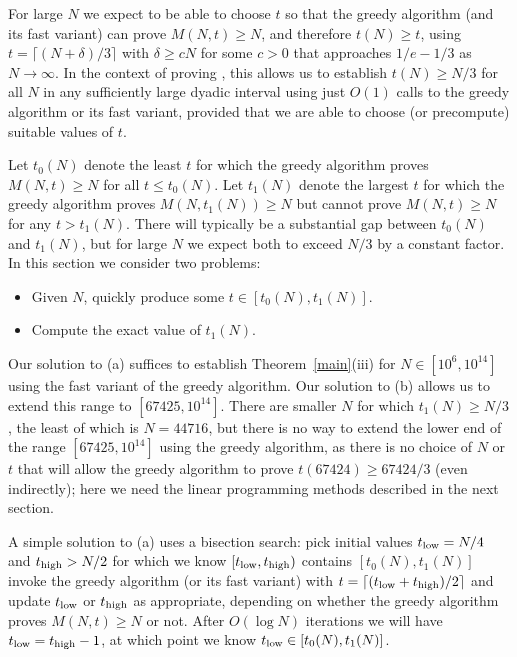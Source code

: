 \documentclass[10pt,a4paper,reqno]{amsart}
\numberwithin{equation}{section}
\theoremstyle{plain}
\theoremstyle{definition}
\begin{document}
For large $N$ we expect to be able to choose $t$ so that the greedy algorithm (and its fast variant) can prove $M(N,t)\ge N$, and therefore $t(N)\ge t$, using $t=\lceil (N+\delta)/3\rceil$ with $\delta \ge cN$ for some $c>0$ that approaches $1/e-1/3$ as $N\to \infty$.  In the context of proving , this allows us to establish $t(N)\ge N/3$ for all $N$ in any sufficiently large dyadic interval using just $O(1)$ calls to the greedy algorithm or its fast variant, provided that we are able to choose (or precompute) suitable values of $t$.

Let $t_0(N)$ denote the least $t$ for which the greedy algorithm proves $M(N,t)\ge N$ for all $t\le t_0(N)$.  Let $t_1(N)$ denote the largest $t$ for which the greedy algorithm proves $M(N,t_1(N))\ge N$ but cannot prove $M(N,t)\ge N$ for any $t>t_1(N)$.  There will typically be a substantial gap between $t_0(N)$ and $t_1(N)$, but for large $N$ we expect both to exceed $N/3$ by a constant factor.  In this section we consider two problems:

\begin{itemize}
\item[(a)] Given $N$, quickly produce some $t\in [t_0(N),t_1(N)]$.
\item[(b)] Compute the exact value of $t_1(N)$.
\end{itemize}

Our solution to (a) suffices to establish Theorem~\ref{main}(iii) for $N\in [10^6,10^{14}]$ using the fast variant of the greedy algorithm.
Our solution to (b) allows us to extend this range to $[67425,10^{14}]$.  There are smaller $N$ for which $t_1(N)\ge N/3$, the least of which is $N=44716$, but there is no way to extend the lower end of the range $[67425,10^{14}]$ using the greedy algorithm, as there is no choice of $N$ or $t$ that will allow the greedy algorithm to prove $t(67424) \ge 67424/3$ (even indirectly); here we need the linear programming methods described in the next section.

A simple solution to (a) uses a bisection search: pick initial values $t_{\rm low} = N/4$ and $t_{\rm high} > N/2$ for which we know $[t_{\rm low},t_{\rm high})$ contains $[t_0(N),t_1(N)]$ invoke the greedy algorithm (or its fast variant) with $t=\lceil(t_{\rm low}+t_{\rm high})/2\rceil$ and update $t_{\rm low}$ or $t_{\rm high}$ as appropriate, depending on whether the greedy algorithm proves $M(N,t)\ge N$ or not.  After $O(\log N)$ iterations we will have $t_{\rm low} = t_{\rm high}-1$, at which point we know $t_{\rm low}\in [t_0(N),t_1(N)]$.
\end{document}
